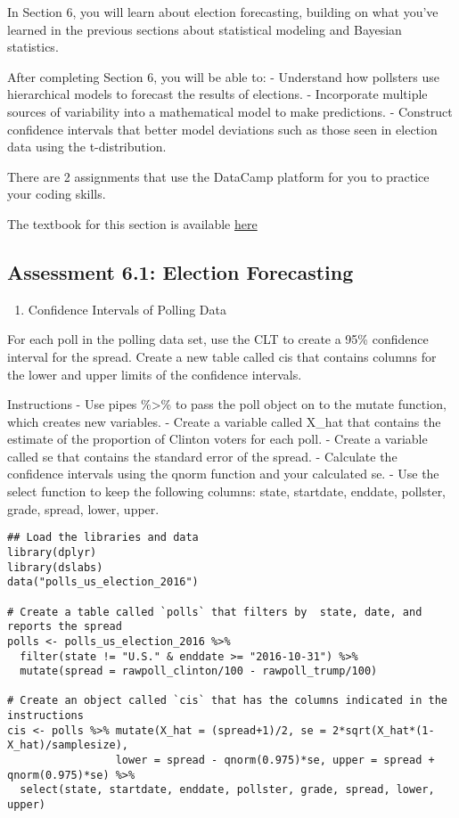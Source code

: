 \documentclass[
]{article}
\providecommand{\tightlist}{%
  \setlength{\itemsep}{0pt}\setlength{\parskip}{0pt}}
\begin{document}
In Section 6, you will learn about election forecasting, building on
what you've learned in the previous sections about statistical modeling
and Bayesian statistics.

After completing Section 6, you will be able to: - Understand how
pollsters use hierarchical models to forecast the results of elections.
- Incorporate multiple sources of variability into a mathematical model
to make predictions. - Construct confidence intervals that better model
deviations such as those seen in election data using the t-distribution.

There are 2 assignments that use the DataCamp platform for you to
practice your coding skills.

The textbook for this section is available
\href{https://rafalab.github.io/dsbook/models.html\#election-forecasting}{here}

\hypertarget{assessment-6.1-election-forecasting}{%
\subsection{Assessment 6.1: Election
Forecasting}\label{assessment-6.1-election-forecasting}}

\begin{enumerate}
\def\labelenumi{\arabic{enumi}.}
\tightlist
\item
  Confidence Intervals of Polling Data
\end{enumerate}

For each poll in the polling data set, use the CLT to create a 95\%
confidence interval for the spread. Create a new table called cis that
contains columns for the lower and upper limits of the confidence
intervals.

Instructions - Use pipes \%\textgreater\% to pass the poll object on to
the mutate function, which creates new variables. - Create a variable
called X\_hat that contains the estimate of the proportion of Clinton
voters for each poll. - Create a variable called se that contains the
standard error of the spread. - Calculate the confidence intervals using
the qnorm function and your calculated se. - Use the select function to
keep the following columns: state, startdate, enddate, pollster, grade,
spread, lower, upper.

\begin{verbatim}
## Load the libraries and data
library(dplyr)
library(dslabs)
data("polls_us_election_2016")

# Create a table called `polls` that filters by  state, date, and reports the spread
polls <- polls_us_election_2016 %>% 
  filter(state != "U.S." & enddate >= "2016-10-31") %>% 
  mutate(spread = rawpoll_clinton/100 - rawpoll_trump/100)

# Create an object called `cis` that has the columns indicated in the instructions
cis <- polls %>% mutate(X_hat = (spread+1)/2, se = 2*sqrt(X_hat*(1-X_hat)/samplesize), 
                 lower = spread - qnorm(0.975)*se, upper = spread + qnorm(0.975)*se) %>%
  select(state, startdate, enddate, pollster, grade, spread, lower, upper)
\end{verbatim}
\end{document}
